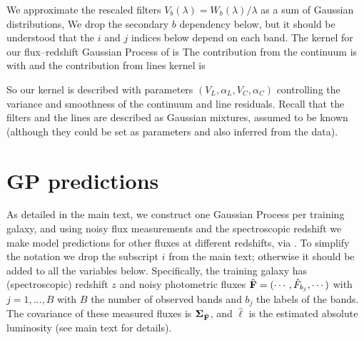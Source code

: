 \documentclass[aps,prd,showpacs,superscriptaddress,groupedaddress]{revtex4}  %
\begin{document}
We approximate the rescaled filters $V_b(\lambda) = W_b(\lambda)/\lambda$ as a sum of Gaussian distributions,
We drop the secondary $b$ dependency below, but it should be understood that the $i$ and $j$ indices below depend on each band.
The kernel for our flux--redshift Gaussian Process of  is
The contribution from the continuum is
with
and the contribution from lines kernel is

So our kernel is described with parameters $(V_L,  \alpha_L, V_C, \alpha_C)$ controlling the variance and smoothness of the continuum and line residuals. Recall that the filters and the lines are described as Gaussian mixtures, assumed to be known (although they could be set as parameters and also inferred from the data).


\section{GP predictions}\label{sec:gppred}

As detailed in the main text, we construct one Gaussian Process per training galaxy, and using noisy flux measurements and the spectroscopic redshift we make model predictions for other fluxes at different redshifts, via . 
To simplify the notation we drop the subscript $i$ from the main text; otherwise it should be added to all the variables below.
Specifically, the training galaxy has (spectroscopic) redshift $z$ and noisy photometric fluxes $\hat{\mat{F}} = (\cdots, \hat{F}_{b_j}, \cdots)$ with $j=1, \dots, B$ with $B$ the number of observed bands and $b_j$ the labels of the bands. 
The covariance of these measured fluxes is $\mat{\Sigma}_{\hat{\mat{F}}}$, and $\hat{\ell}$ is the estimated absolute luminosity (see main text for details).
\end{document}
